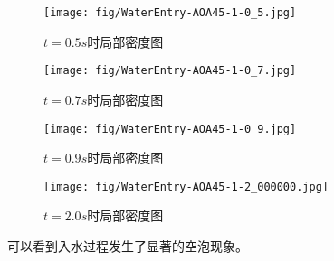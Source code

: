 \begin{figure}[!htp]
  \centering
  \texttt{[image: fig/WaterEntry-AOA45-1-0\_5.jpg]}
  \caption{$t=0.5s$时局部密度图}
\end{figure}

\begin{figure}[!htp]
  \centering
  \texttt{[image: fig/WaterEntry-AOA45-1-0\_7.jpg]}
  \caption*{$t=0.7s$时局部密度图} 
\end{figure}

\begin{figure}[!htp]
  \centering
  \texttt{[image: fig/WaterEntry-AOA45-1-0\_9.jpg]}
  \caption{$t=0.9s$时局部密度图} 
\end{figure}

\begin{figure}[!htp]
  \centering
  \texttt{[image: fig/WaterEntry-AOA45-1-2\_000000.jpg]}
  \caption{$t=2.0s$时局部密度图} 
\end{figure}

可以看到入水过程发生了显著的空泡现象。